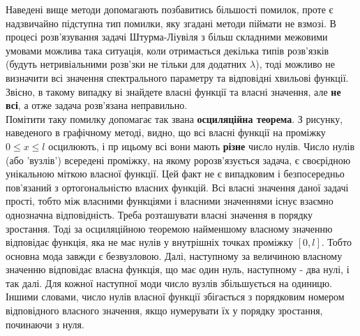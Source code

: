 \documentclass[a4paper, 14pt]{extreport}
\begin{document}
Наведені вище методи допомагають позбавитись більшості помилок, проте є надзвичайно підступна тип помилки, яку згадані методи піймати не взмозі. В процесі розв'язування задачі Штурма-Ліувіля з більш складними межовими умовами можлива така ситуація, коли отримається декілька типів розв'язків (будуть нетривіальними розв'зки не тільки для додатних $\lambda$), тоді можливо не визначити всі значення спектрального параметру та відповідні хвильові функції. Звісно, в такому випадку ві знайдете власні функції та власні значення, але \textbf{не всі}, а отже задача розв'язана неправильно.\\
Помітити таку помилку допомагає так звана \textbf{осциляційна теорема}. З рисунку, наведеного в графічному методі, видно, що всі власні функції на проміжку $0 \leq x \leq l$ осцилюють, і пр ицьому всі вони мають \textbf{різне} число нулів. Число нулів (або 'вузлів') всередені проміжку, на якому ророзв’язується задача, є своєрідною унікальною міткою власної функції. Цей факт не є випадковим і безпосередньо пов’язаний з ортогональністю власних функцій. Всі власні значення даної задачі прості, тобто між власними функціями і власними значеннями існує взаємно однозначна відповідність. Треба розташувати власні значення в порядку зростання. Тоді за осциляційною теоремою найменшому власному значенню відповідає функція, яка не має нулів у внутрішніх точках проміжку $[0, l]$. Тобто основна мода завжди є безвузловою. Далі, наступному за величиною власному значенню відповідає власна функція, що має один нуль, наступному - два нулі, і так далі. Для кожної наступної моди число вузлів збільшується на одиницю. Іншими словами, число нулів власної функції збігається з порядковим номером відповідного власного значення, якщо нумерувати їх у порядку зростання, починаючи з нуля.
\end{document}
